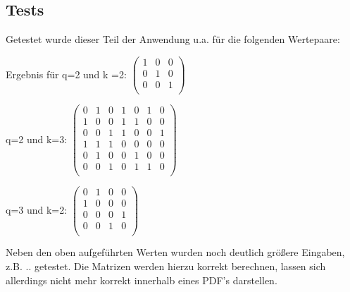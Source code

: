 \subsection{Tests}
Getestet wurde dieser Teil der Anwendung u.a. für die folgenden Wertepaare:

\begin{description}
	\item
	Ergebnis für q=2 und k =2:
	$
		\begin{pmatrix}
			1 & 0 & 0 \\
			0 & 1 & 0 \\
			0 & 0 & 1 \\
		\end{pmatrix}
	$
	\item
	q=2 und k=3:			
	$
	\begin{pmatrix}
		0 & 1 & 0 & 1 & 0 & 1 & 0 \\
		1 & 0 & 0 & 1 & 1 & 0 & 0 \\
		0 & 0 & 1 & 1 & 0 & 0 & 1 \\
		1 & 1 & 1 & 0 & 0 & 0 & 0 \\
		0 & 1 & 0 & 0 & 1 & 0 & 0 \\
		0 & 0 & 1 & 0 & 1 & 1 & 0 \\
	\end{pmatrix}
	$ 
	\item 
	q=3 und k=2: 
	$
	\begin{pmatrix}
		0 & 1 & 0 & 0 \\
		1 & 0 & 0 & 0 \\
		0 & 0 & 0 & 1 \\
		0 & 0 & 1 & 0 \\		
	\end{pmatrix}
	$
\end{description}
Neben den oben aufgeführten Werten wurden noch deutlich größere Eingaben, z.B. .. getestet. Die Matrizen werden hierzu korrekt berechnen, lassen sich allerdings nicht mehr korrekt innerhalb eines PDF's darstellen.